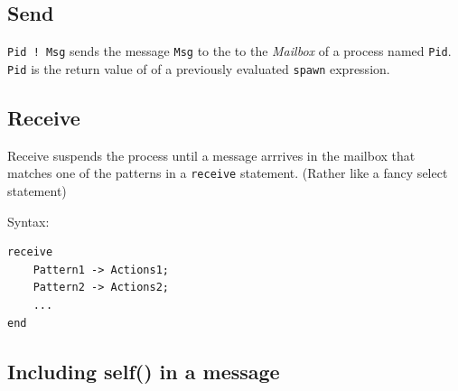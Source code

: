 \documentclass[12pt]{article}
\begin{document}
\subsection{Send}

\verb+Pid ! Msg+ sends the message \verb+Msg+ to the 
to the {\sl Mailbox} of a process named \verb+Pid+.
\verb+Pid+ is the return value of of a previously evaluated \verb+spawn+
expression.

\subsection{Receive}

Receive suspends the process until a message arrrives in the mailbox
that matches one of the patterns in a \verb+receive+ statement.
(Rather like a fancy select statement)

Syntax:

\begin{verbatim}
receive
    Pattern1 -> Actions1;
    Pattern2 -> Actions2;
    ...
end
\end{verbatim}

\subsection{Including self()  in a message}
\end{document}
